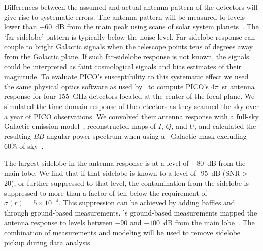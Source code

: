 \documentclass[PICOReport.tex]{subfiles}
\begin{document}
Differences between the assumed and actual antenna pattern of the detectors will give rise to systematic errors. The antenna pattern will be measured to levels lower than $-60$~dB from the main peak using scans of solar system planets~\citep{tauber2018}. The `far-sidelobe' pattern is typically below the noise level. Far-sidelobe response can couple to bright Galactic signals when the telescope points tens of degrees away from the Galactic plane. If such far-sidelobe response is not known, the signals could be interpreted as faint cosmological signals and bias estimates of their magnitude. To evaluate PICO's susceptibility to this systematic effect we used the same physical optics software as used by \planck\ to compute PICO's $4\pi$~sr antenna response for four 155~GHz detectors located at the center of the focal plane. We simulated the time domain response of the detectors as they scanned the sky over a year of PICO observations. We convolved their antenna response with a full-sky Galactic emission model~\citep{thorne2018_pysm}, reconstructed maps of $I$, $Q$, and $U$, and calculated the resulting $BB$ angular power spectrum when using a \planck\ Galactic mask excluding 60\% of sky~\citep{planck_2013_xv}. 

The largest sidelobe in the antenna response is at a level of $-80$~dB from the main lobe. We find that if that sidelobe is known to a level of -95~dB (\ac{SNR}$>$20), or further suppressed to that level, the contamination from the sidelobe is suppressed to more than a factor of ten below the requirement of $\sigma(r) = 5 \times 10^{-4}$. This suppression can be achieved by adding baffles and through ground-based measurements. \planck 's ground-based measurements mapped the antenna response to levels between $-90$ and $-100$~dB from the main lobe~\citep{planck_sidelobes_IEEE}. The combination of measurements and modeling will be used to remove sidelobe pickup during data analysis. 
 
\end{document}
